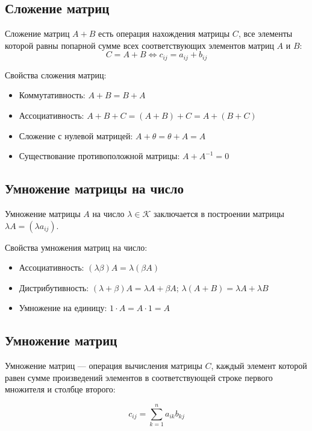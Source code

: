 \documentclass[a4paper,12pt]{extbook}
\theoremstyle{definition}
\begin{document}
\subsection{Сложение матриц}
\label{sec:org930f363}
Сложение матриц \(A + B\) есть операция нахождения матрицы \(C\), все элементы которой равны попарной сумме всех соответствующих элементов матриц \(A\) и \(B\):
\begin{equation*}
    C = A + B \iff c_{ij} = a_{ij} + b_{ij}
\end{equation*}

Свойства сложения матриц:
\begin{itemize}
    \item Коммутативность: \(A + B = B + A\)
    \item Ассоциативность: \(A + B + C = (A + B) + C = A + (B + C)\)
    \item Сложение с нулевой матрицей: \(A + \theta = \theta + A = A\)
    \item Существование противоположной матрицы: \(A + A^{-1} = 0\)
\end{itemize}

\subsection{Умножение матрицы на число}
\label{sec:org006ca40}
Умножение матрицы \(A\) на число \(\lambda \in \mathcal{K}\) заключается в построении матрицы \(\lambda A = (\lambda a_{ij})\).

Свойства умножения матриц на число:
\begin{itemize}
    \item Ассоциативность: \((\lambda \beta) A = \lambda (\beta A)\)
    \item Дистрибутивность: \((\lambda + \beta) A = \lambda A + \beta A\); \quad \(\lambda (A + B) = \lambda A + \lambda B\)
    \item Умножение на единицу: \(1 \cdot A = A \cdot 1 = A\)
\end{itemize}

\subsection{Умножение матриц}
\label{sec:org3cd53f8}
Умножение матриц — операция вычисления матрицы \(C\), каждый элемент которой равен сумме произведений элементов в соответствующей строке первого множителя и столбце второго:

\begin{equation*}
    c_{ij} = \sum_{k=1}^n a_{ik} b_{kj}
\end{equation*}
\end{document}
